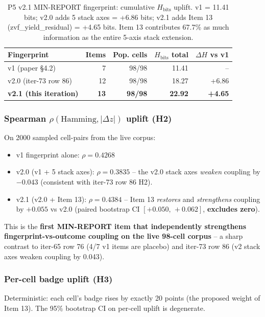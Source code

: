 \begin{table}[ht]
\centering
\small
\caption{P5 v2.1 MIN-REPORT fingerprint: cumulative $H_{\mathrm{bits}}$ uplift.
v1 = 11.41 bits; v2.0 adds 5 stack axes = +6.86 bits; v2.1 adds Item 13
(zvf\_yield\_residual) = +4.65 bits. Item 13 contributes 67.7\% as much
information as the entire 5-axis stack extension.}
\label{tab:p5-v21-uplift}
\begin{tabular}{l r r r r}
\toprule
Fingerprint & Items & Pop. cells & $H_{\mathrm{bits}}$ total & $\Delta H$ vs v1 \\
\midrule
v1 (paper §4.2)        & 7 & 98/98 & 11.41 & -- \\
v2.0 (iter-73 row 86)  & 12 & 98/98 & 18.27 & +6.86 \\
\textbf{v2.1 (this iteration)} & \textbf{13} & \textbf{98/98} & \textbf{22.92} & \textbf{+4.65} \\
\bottomrule
\end{tabular}
\end{table}

\subsubsection{Spearman \texorpdfstring{$\rho(\text{Hamming}, |\Delta z|)$}{rho(Hamming, |Delta z|)} uplift (H2)}
On 2000 sampled cell-pairs from the live corpus:
\begin{itemize}
  \item v1 fingerprint alone: $\rho = 0.4268$
  \item v2.0 (v1 + 5 stack axes): $\rho = 0.3835$ -- the v2.0 stack axes
        \emph{weaken} coupling by $-0.043$ (consistent with iter-73 row 86 H2).
  \item v2.1 (v2.0 + Item 13): $\rho = 0.4384$ -- Item 13 \emph{restores} and
        \emph{strengthens} coupling by $+0.055$ vs v2.0 (paired bootstrap CI
        $[+0.050,\,+0.062]$, \textbf{excludes zero}).
\end{itemize}
This is the \textbf{first MIN-REPORT item that independently strengthens
fingerprint-vs-outcome coupling on the live 98-cell corpus} -- a sharp
contrast to iter-65 row 76 (4/7 v1 items are placebo) and iter-73 row 86
(v2 stack axes weaken coupling by 0.043).

\subsubsection{Per-cell badge uplift (H3)}
Deterministic: each cell's badge rises by exactly 20 points (the proposed
weight of Item 13). The 95\% bootstrap CI on per-cell uplift is degenerate.

